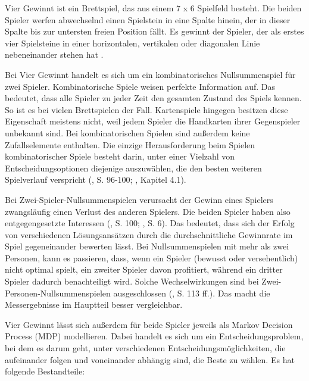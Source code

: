 Vier Gewinnt ist ein Brettspiel, das aus einem 7 x 6 Spielfeld besteht. Die beiden Spieler werfen abwechselnd einen Spielstein in eine Spalte hinein, der in dieser Spalte bis zur untersten freien Position fällt. Es gewinnt der Spieler, der als erstes vier Spielsteine in einer horizontalen, vertikalen oder diagonalen Linie nebeneinander stehen hat \cite{MiltonBradleyCompany.1990}.

Bei Vier Gewinnt handelt es sich um ein kombinatorisches Nullsummenspiel für zwei Spieler. Kombinatorische Spiele weisen \glqq perfekte Information\grqq{} auf. Das bedeutet, dass alle Spieler zu jeder Zeit den gesamten Zustand des Spiels kennen. So ist es bei vielen Brettspielen der Fall. Kartenspiele hingegen besitzen diese Eigenschaft meistens nicht, weil jedem Spieler die Handkarten ihrer Gegenspieler unbekannt sind. Bei kombinatorischen Spielen sind außerdem keine Zufallselemente enthalten. Die einzige Herausforderung beim Spielen kombinatorischer Spiele besteht darin, unter einer Vielzahl von Entscheidungsoptionen diejenige auszuwählen, die den besten weiteren Spielverlauf verspricht (\cite{Bewersdorff.2018}, S. 96-100; \cite{Ferguson.January2019}, Kapitel 4.1).

Bei Zwei-Spieler-Nullsummenspielen verursacht der Gewinn eines Spielers zwangsläufig einen Verlust des anderen Spielers. Die beiden Spieler haben also entgegengesetzte Interessen (\cite{Bewersdorff.2018}, S. 100; \cite{Allis.1994}, S. 6). Das bedeutet, dass sich der Erfolg von verschiedenen Lösungsansätzen durch die durchschnittliche Gewinnrate im Spiel gegeneinander bewerten lässt. Bei Nullsummenspielen mit mehr als zwei Personen, kann es passieren, dass, wenn ein Spieler (bewusst oder versehentlich) nicht optimal spielt, ein zweiter Spieler davon profitiert, während ein dritter Spieler dadurch benachteiligt wird. Solche Wechselwirkungen sind bei Zwei-Personen-Nullsummenspielen ausgeschlossen (\cite{Bewersdorff.2018}, S. 113 ff.). Das macht die Messergebnisse im Hauptteil besser vergleichbar.

Vier Gewinnt lässt sich außerdem für beide Spieler jeweils als Markov Decision Process (MDP) modellieren. Dabei handelt es sich um ein Entscheidungsproblem, bei dem es darum geht, unter verschiedenen Entscheidungsmöglichkeiten, die aufeinander folgen und voneinander abhängig sind, die Beste zu wählen. Es hat folgende Bestandteile:

